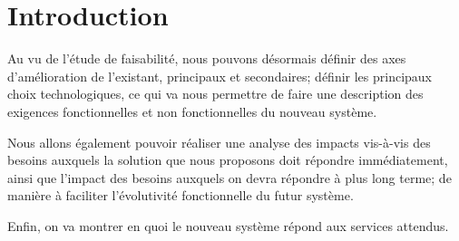 \section{Introduction}


Au vu de l'étude de faisabilité, nous pouvons désormais définir
des axes d'amélioration de l'existant, principaux et secondaires;
définir les principaux choix technologiques, ce qui va nous permettre
de faire une description des exigences fonctionnelles et non fonctionnelles
du nouveau système.

Nous allons également pouvoir réaliser une analyse des impacts vis-à-vis
des besoins auxquels la solution que nous proposons doit répondre
immédiatement, ainsi que l'impact des besoins auxquels on devra répondre à
plus long terme; de manière à faciliter l'évolutivité fonctionnelle du
futur système.

Enfin, on va montrer en quoi le nouveau système répond aux services attendus. 
